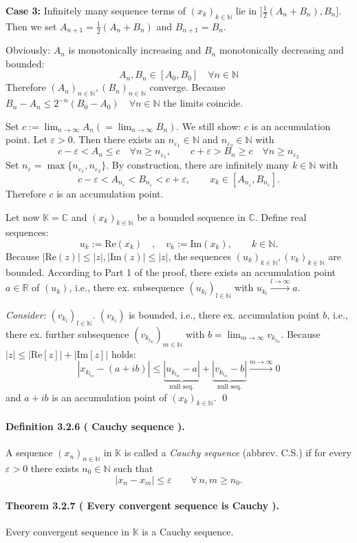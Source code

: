 \documentclass[12pt]{article}
\newcommand{\N}{\mathbb{N}}
\newcommand{\R}{\mathbb{R}}
\newcommand{\C}{\mathbb{C}}
\newcommand{\K}{\mathbb{K}} %
\newcommand{\eps}{\varepsilon}
\newcommand{\NumberedDefinition}[3]{%
\paragraph*{Definition #1 ( #2 ).} #3\par}
\newcommand{\NumberedTheorem}[3]{%
\paragraph*{Theorem #1 ( #2 ).} #3\par}
\begin{document}
\textbf{Case 3:} Infinitely many sequence terms of $(x_k)_{k \in \N}$ lie in $]\frac{1}{2}(A_n + B_n), B_n]$. Then we set $A_{n+1} = \frac{1}{2}(A_n + B_n)$ and $B_{n+1} = B_n$.

Obviously: $A_n$ is monotonically increasing and $B_n$ monotonically decreasing and bounded:
\[
A_n, B_n \in [A_0, B_0] \quad \forall n \in \N
\]
Therefore $(A_n)_{n \in \N}, (B_n)_{n \in \N}$ converge. Because $B_n - A_n \le 2^{-n}(B_0 - A_0) \quad \forall n \in \N$ the limits coincide.

Set $c := \lim_{n \to \infty} A_n (= \lim_{n \to \infty} B_n)$. We still show: $c$ is an accumulation point.
Let $\eps > 0$. Then there exists an $n_{\eps_1} \in \N$ and $n_{\eps_2} \in \N$ with
\[
c - \eps < A_n \le c \quad \forall n \ge n_{\eps_1}, \qquad c + \eps > B_n \ge c \quad \forall n \ge n_{\eps_2}
\]
Set $n_\eps = \max\{n_{\eps_1}, n_{\eps_2}\}$. By construction, there are infinitely many $k \in \N$ with
\[
c - \eps < A_{n_\eps} < B_{n_\eps} < c + \eps, \qquad x_k \in [A_{n_\eps}, B_{n_\eps}].
\]
Therefore $c$ is an accumulation point.

Let now $\K = \C$ and $(x_k)_{k \in \N}$ be a bounded sequence in $\C$. Define real sequences:
\[
u_k := \text{Re}(x_k) \quad , \quad v_k := \text{Im}(x_k), \qquad k \in \N.
\]
Because $|\text{Re}(z)| \le |z|, |\text{Im}(z)| \le |z|$, the sequences $(u_k)_{k \in \N}, (v_k)_{k \in \N}$ are bounded. According to Part 1 of the proof, there exists an accumulation point $a \in \R$ of $(u_k)$, i.e., there ex. subsequence $(u_{k_l})_{l \in \N}$ with $u_{k_l} \xrightarrow{l \to \infty} a$.

\textit{Consider:} $(v_{k_l})_{l \in \N}$. $(v_{k_l})$ is bounded, i.e., there ex. accumulation point $b$, i.e., there ex. further subsequence $(v_{k_{l_m}})_{m \in \N}$ with $b = \lim_{m \to \infty} v_{k_{l_m}}$. Because $|z| \le |\text{Re}[z]| + |\text{Im}[z]|$ holds:
\[
\left| x_{k_{l_m}} - (a + ib) \right| \le \underbrace{\left| u_{k_{l_m}} - a \right|}_{\text{null seq.}} + \underbrace{\left| v_{k_{l_m}} - b \right|}_{\text{null seq.}} \xrightarrow{m \to \infty} 0
\]
and $a + ib$ is an accumulation point of $(x_k)_{k \in \N}$. \qed

\NumberedDefinition{3.2.6}{Cauchy sequence}{A sequence $(x_n)_{n\in\N}$ in $\K$ is called a \emph{Cauchy sequence} (abbrev. C.S.) if for every $\eps>0$ there exists $n_0\in\N$ such that
\[
	|x_n - x_m| \le \eps \qquad \forall\, n,m\ge n_0.
\]}

\NumberedTheorem{3.2.7}{Every convergent sequence is Cauchy}{Every convergent sequence in $\K$ is a Cauchy sequence.}
\end{document}
